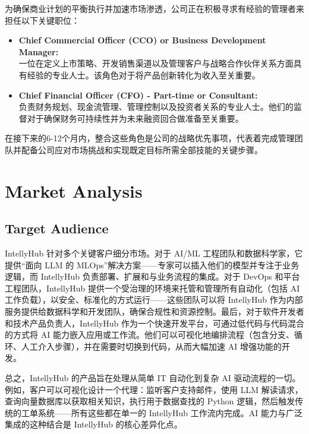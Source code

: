 \documentclass[11pt, a4paper, oneside]{article}
\begin{document}
为确保商业计划的平衡执行并加速市场渗透，公司正在积极寻求有经验的管理者来担任以下关键职位：

\begin{itemize}
    \item \textbf{Chief Commercial Officer (CCO) or Business Development Manager:} \\
    一位在定义上市策略、开发销售渠道以及管理客户与战略合作伙伴关系方面具有经验的专业人士。该角色对于将产品创新转化为收入至关重要。

    \item \textbf{Chief Financial Officer (CFO) - Part-time or Consultant:} \\
    负责财务规划、现金流管理、管理控制以及投资者关系的专业人士。他们的监督对于确保财务可持续性并为未来融资回合做准备至关重要。
\end{itemize}

在接下来的6-12个月内，整合这些角色是公司的战略优先事项，代表着完成管理团队并配备公司应对市场挑战和实现既定目标所需全部技能的关键步骤。


\section{Market Analysis}
\subsection{Target Audience}
IntellyHub 针对多个关键客户细分市场。对于 AI/ML 工程团队和数据科学家，它提供“面向 LLM 的 MLOps”解决方案——专家可以插入他们的模型并专注于业务逻辑，而 IntellyHub 负责部署、扩展和与业务流程的集成。对于 DevOps 和平台工程团队，IntellyHub 提供一个受治理的环境来托管和管理所有自动化（包括 AI 工作负载），以安全、标准化的方式运行——这些团队可以将 IntellyHub 作为内部服务提供给数据科学和开发团队，确保合规性和资源控制。最后，对于软件开发者和技术产品负责人，IntellyHub 作为一个快速开发平台，可通过低代码与代码混合的方式将 AI 能力嵌入应用或工作流。他们可以可视化地编排流程（包含分支、循环、人工介入步骤），并在需要时切换到代码，从而大幅加速 AI 增强功能的开发。


总之，IntellyHub 的产品旨在处理从简单 IT 自动化到复杂 AI 驱动流程的一切。例如，客户可以可视化设计一个代理：监听客户支持邮件，使用 LLM 解读请求，查询向量数据库以获取相关知识，执行用于数据查找的 Python 逻辑，然后触发传统的工单系统——所有这些都在单一的 IntellyHub 工作流内完成。AI 能力与广泛集成的这种结合是 IntellyHub 的核心差异化点。
\end{document}
